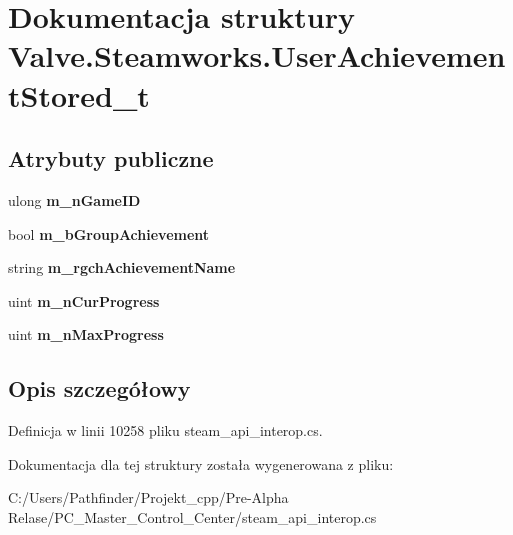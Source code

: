 \hypertarget{struct_valve_1_1_steamworks_1_1_user_achievement_stored__t}{}\section{Dokumentacja struktury Valve.\+Steamworks.\+User\+Achievement\+Stored\+\_\+t}
\label{struct_valve_1_1_steamworks_1_1_user_achievement_stored__t}
\subsection*{Atrybuty publiczne}
\begin{DoxyCompactItemize}
\item 
\mbox{\label{struct_valve_1_1_steamworks_1_1_user_achievement_stored__t_affe479df252ab6d1f3ee71003bcc827c}} 
ulong {\bfseries m\+\_\+n\+Game\+ID}
\item 
\mbox{\label{struct_valve_1_1_steamworks_1_1_user_achievement_stored__t_a3f73a1a274d980b9648c86120ca57923}} 
bool {\bfseries m\+\_\+b\+Group\+Achievement}
\item 
\mbox{\label{struct_valve_1_1_steamworks_1_1_user_achievement_stored__t_a2f49f0b2cadd016ff23285e1bae6e16d}} 
string {\bfseries m\+\_\+rgch\+Achievement\+Name}
\item 
\mbox{\label{struct_valve_1_1_steamworks_1_1_user_achievement_stored__t_a1f5fa193ab0533e9c7b40814656e8f85}} 
uint {\bfseries m\+\_\+n\+Cur\+Progress}
\item 
\mbox{\label{struct_valve_1_1_steamworks_1_1_user_achievement_stored__t_a0716c5d8acea4702b2e2dcd25dbc37c2}} 
uint {\bfseries m\+\_\+n\+Max\+Progress}
\end{DoxyCompactItemize}


\subsection{Opis szczegółowy}


Definicja w linii 10258 pliku steam\+\_\+api\+\_\+interop.\+cs.



Dokumentacja dla tej struktury została wygenerowana z pliku\+:\begin{DoxyCompactItemize}
\item 
C\+:/\+Users/\+Pathfinder/\+Projekt\+\_\+cpp/\+Pre-\/\+Alpha Relase/\+P\+C\+\_\+\+Master\+\_\+\+Control\+\_\+\+Center/steam\+\_\+api\+\_\+interop.\+cs\end{DoxyCompactItemize}

